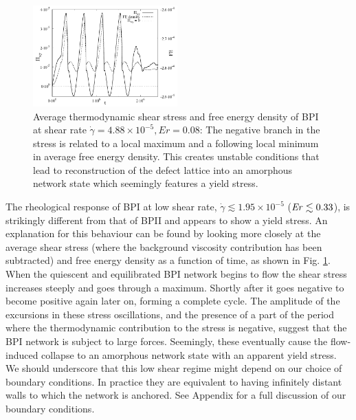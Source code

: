 \documentclass[8.5pt,twoside,twocolumn]{article}
\newcommand{\e}[1]{\times10^{#1}}
\newcommand{\gd}{\dot{\gamma}}
\begin{document}
\begin{figure}[htpb]
\includegraphics[width=0.495\textwidth]{stress_fe_yield_bp1.pdf}
\caption{Average thermodynamic shear stress and free energy density of 
BPI at shear rate $\gd=4.88\e{-5}, Er=0.08$: 
The negative branch in the stress is related to a local maximum 
and a following local minimum in average free energy density. 
This creates unstable conditions that lead to reconstruction of the 
defect lattice into an amorphous network state which 
seemingly features a yield stress.}
\label{bp1-fe-yield}
\end{figure}

The rheological response of BPI at low shear rate, $\gd\lesssim1.95\e{-5}$
(${\it Er} \lesssim 0.33$), 
is strikingly different from that of BPII and appears to show a
yield stress. An explanation for this behaviour can be found by 
looking more closely at the average shear stress (where the
background viscosity contribution has been subtracted) and 
free energy density as a function of time, as shown in Fig. \ref{bp1-fe-yield}.
When the quiescent and equilibrated BPI network begins to flow
the shear stress increases steeply and goes through a maximum.
Shortly after it goes negative 
to become positive again later on, forming a complete cycle.
The amplitude of the excursions in these stress oscillations, and
the presence of a part of the period where the thermodynamic
contribution to the stress is negative, suggest that the
BPI network is subject to large forces. Seemingly, these eventually
cause the flow-induced collapse to an amorphous network state with
an apparent yield stress. We should underscore that this
low shear regime might depend on our choice of boundary
conditions. In practice they are equivalent to 
having infinitely distant walls to which the network is anchored. 
See Appendix for a full discussion of our boundary conditions.
\end{document}
